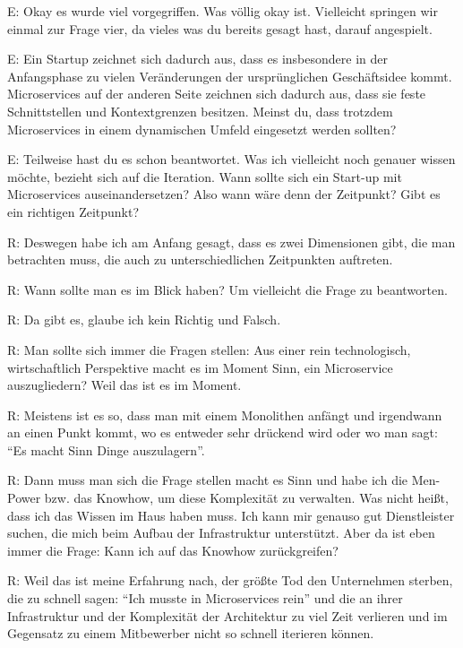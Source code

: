E: Okay es wurde viel vorgegriffen. Was völlig okay ist. Vielleicht springen wir einmal zur Frage vier, da vieles was du bereits gesagt hast, darauf angespielt.

E: Ein Startup zeichnet sich dadurch aus, dass es insbesondere in der Anfangsphase zu vielen Veränderungen der ursprünglichen Geschäftsidee kommt. Microservices auf der anderen Seite zeichnen sich dadurch aus, dass sie feste Schnittstellen und Kontextgrenzen besitzen. Meinst du, dass trotzdem Microservices in einem dynamischen Umfeld eingesetzt werden sollten?

E: Teilweise hast du es schon beantwortet. Was ich vielleicht noch genauer wissen möchte, bezieht sich auf die Iteration. Wann sollte sich ein Start-up mit Microservices auseinandersetzen? Also wann wäre denn der Zeitpunkt? Gibt es ein richtigen Zeitpunkt? 

R: Deswegen habe ich am Anfang gesagt, dass es zwei Dimensionen gibt, die man betrachten muss, die auch zu unterschiedlichen Zeitpunkten auftreten.

R: Wann sollte man es im Blick haben? Um vielleicht die Frage zu beantworten.

\label{appendix:r-6}
R: Da gibt es, glaube ich kein Richtig und Falsch.

\label{appendix:r-7}
R: Man sollte sich immer die Fragen stellen: Aus einer rein technologisch, wirtschaftlich Perspektive macht es im Moment Sinn, ein Microservice auszugliedern? Weil das ist es im Moment.

\label{appendix:r-8} \label{appendix:r-9}
R: Meistens ist es so, dass man mit einem Monolithen anfängt und irgendwann an einen Punkt kommt, wo es entweder sehr drückend wird oder wo man sagt: “Es macht Sinn Dinge auszulagern”.

\label{appendix:r-10}
R: Dann muss man sich die Frage stellen macht es Sinn und habe ich die Men-Power bzw. das Knowhow, um diese Komplexität zu verwalten. Was nicht heißt, dass ich das Wissen im Haus haben muss. Ich kann mir genauso gut Dienstleister suchen, die mich beim Aufbau der Infrastruktur unterstützt. Aber da ist eben immer die Frage: Kann ich auf das Knowhow zurückgreifen?

\label{appendix:r-11}
R: Weil das ist meine Erfahrung nach, der größte Tod den Unternehmen sterben, die zu schnell sagen: “Ich musste in Microservices rein” und die an ihrer Infrastruktur und der Komplexität der Architektur zu viel Zeit verlieren und im Gegensatz zu einem Mitbewerber nicht so schnell iterieren können. 

